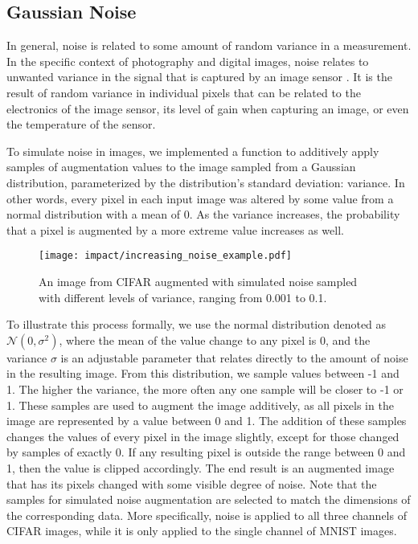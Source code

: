 \documentclass[conference]{IEEEtran}
\begin{document}
\subsection{Gaussian Noise}

In general, noise is related to some amount of random variance in a measurement. In the specific context of photography and digital images, noise relates to unwanted variance in the signal that is captured by an image sensor \cite{photoencyc}. It is the result of random variance in individual pixels that can be related to the electronics of the image sensor, its level of gain when capturing an image, or even the temperature of the sensor.

To simulate noise in images, we implemented a function to additively apply samples of augmentation values to the image sampled from a Gaussian distribution, parameterized by the distribution’s standard deviation: variance. In other words, every pixel in each input image was altered by some value from a normal distribution with a mean of 0. As the variance increases, the probability that a pixel is augmented by a more extreme value increases as well.

\begin{figure}[!b]
    \centering
    \texttt{[image: impact/increasing\_noise\_example.pdf]}
    \captionsetup{width=1\columnwidth}
    \caption{An image from CIFAR augmented with simulated noise sampled with different levels of variance, ranging from 0.001 to 0.1.}
    \label{fig:increasing_noise}
\end{figure}

To illustrate this process formally, we use the normal distribution denoted as $\mathcal{N} (0, \sigma^2)$, where the mean of the value change to any pixel is 0, and the variance $\sigma$ is an adjustable parameter that relates directly to the amount of noise in the resulting image. From this distribution, we sample values between -1 and 1. The higher the variance, the more often any one sample will be closer to -1 or 1. These samples are used to augment the image additively, as all pixels in the image are represented by a value between 0 and 1. The addition of these samples changes the values of every pixel in the image slightly, except for those changed by samples of exactly 0. If any resulting pixel is outside the range between 0 and 1, then the value is clipped accordingly. The end result is an augmented image that has its pixels changed with some visible degree of noise. Note that the samples for simulated noise augmentation are selected to match the dimensions of the corresponding data. More specifically, noise is applied to all three channels of CIFAR images, while it is only applied to the single channel of MNIST images.
\end{document}
